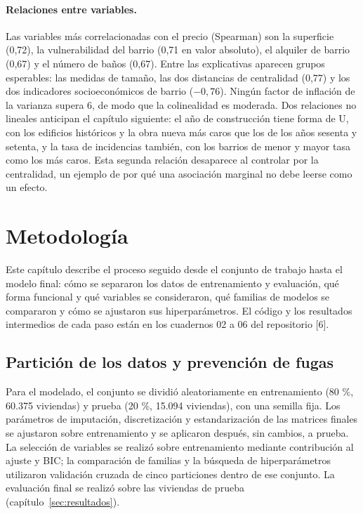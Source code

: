 \documentclass[11pt,a4paper]{article}
\begin{document}
\paragraph{Relaciones entre variables.} Las variables más correlacionadas con el precio (Spearman) son la superficie (0,72), la vulnerabilidad del barrio (0,71 en valor absoluto), el alquiler de barrio (0,67) y el número de baños (0,67). Entre las explicativas aparecen grupos esperables: las medidas de tamaño, las dos distancias de centralidad (0,77) y los dos indicadores socioeconómicos de barrio ($-0{,}76$). Ningún factor de inflación de la varianza supera 6, de modo que la colinealidad es moderada. Dos relaciones no lineales anticipan el capítulo siguiente: el año de construcción tiene forma de U, con los edificios históricos y la obra nueva más caros que los de los años sesenta y setenta, y la tasa de incidencias también, con los barrios de menor y mayor tasa como los más caros. Esta segunda relación desaparece al controlar por la centralidad, un ejemplo de por qué una asociación marginal no debe leerse como un efecto.

\section{Metodología}\label{sec:metodologia}

Este capítulo describe el proceso seguido desde el conjunto de trabajo hasta el modelo final: cómo se separaron los datos de entrenamiento y evaluación, qué forma funcional y qué variables se consideraron, qué familias de modelos se compararon y cómo se ajustaron sus hiperparámetros. El código y los resultados intermedios de cada paso están en los cuadernos 02 a 06 del repositorio [6].

\subsection{Partición de los datos y prevención de fugas}

Para el modelado, el conjunto se dividió aleatoriamente en entrenamiento (80 \%, 60.375 viviendas) y prueba (20 \%, 15.094 viviendas), con una semilla fija. Los parámetros de imputación, discretización y estandarización de las matrices finales se ajustaron sobre entrenamiento y se aplicaron después, sin cambios, a prueba. La selección de variables se realizó sobre entrenamiento mediante contribución al ajuste y BIC; la comparación de familias y la búsqueda de hiperparámetros utilizaron validación cruzada de cinco particiones dentro de ese conjunto. La evaluación final se realizó sobre las viviendas de prueba (capítulo~\ref{sec:resultados}).
\end{document}
